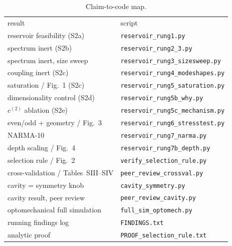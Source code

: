 \documentclass[aps,prapplied,reprint,amsmath,amssymb,floatfix]{revtex4-2}
\begin{document}
\begin{table}[h]
\caption{Claim-to-code map.}
\label{tab:repro}
\begin{ruledtabular}
\begin{tabular}{ll}
result & script \\
\colrule
reservoir feasibility (S2a)        & \texttt{reservoir\_rung1.py} \\
spectrum inert (S2b)               & \texttt{reservoir\_rung2\_3.py} \\
spectrum inert, size sweep         & \texttt{reservoir\_rung3\_sizesweep.py} \\
coupling inert (S2c)               & \texttt{reservoir\_rung4\_modeshapes.py} \\
saturation / Fig.~1 (S2c)          & \texttt{reservoir\_rung5\_saturation.py} \\
dimensionality control (S2d)       & \texttt{reservoir\_rung5b\_why.py} \\
$c^{(2)}$ ablation (S2e)           & \texttt{reservoir\_rung5c\_mechanism.py} \\
even/odd + geometry / Fig.~3       & \texttt{reservoir\_rung6\_stresstest.py} \\
NARMA-10                           & \texttt{reservoir\_rung7\_narma.py} \\
depth scaling / Fig.~4             & \texttt{reservoir\_rung7b\_depth.py} \\
selection rule / Fig.~2            & \texttt{verify\_selection\_rule.py} \\
cross-validation / Tables~SIII--SIV& \texttt{peer\_review\_crossval.py} \\
cavity = symmetry knob             & \texttt{cavity\_symmetry.py} \\
cavity result, peer review         & \texttt{peer\_review\_cavity.py} \\
optomechanical full simulation     & \texttt{full\_sim\_optomech.py} \\
running findings log               & \texttt{FINDINGS.txt} \\
analytic proof                     & \texttt{PROOF\_selection\_rule.txt} \\
\end{tabular}
\end{ruledtabular}
\end{table}
\end{document}
